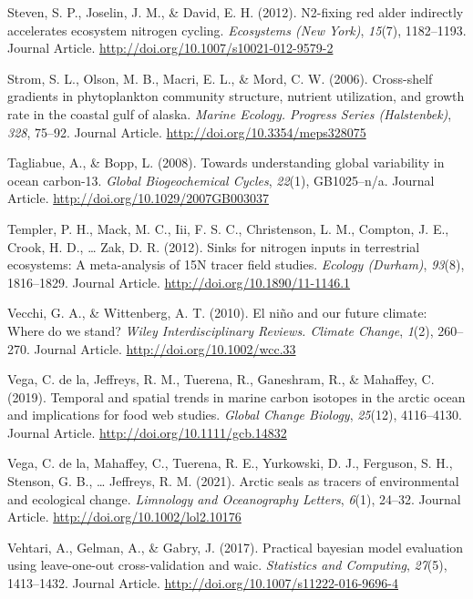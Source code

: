 \documentclass [11pt, proquest] {uwthesis}[2015/03/03]
\begin{document}
\hypertarget{ref-Perakis2012}{}
Steven, S. P., Joselin, J. M., \& David, E. H. (2012). N2-fixing red
alder indirectly accelerates ecosystem nitrogen cycling.
\emph{Ecosystems (New York)}, \emph{15}(7), 1182--1193. Journal Article.
\url{http://doi.org/10.1007/s10021-012-9579-2}

\hypertarget{ref-Strom2006}{}
Strom, S. L., Olson, M. B., Macri, E. L., \& Mord, C. W. (2006).
Cross-shelf gradients in phytoplankton community structure, nutrient
utilization, and growth rate in the coastal gulf of alaska. \emph{Marine
Ecology. Progress Series (Halstenbek)}, \emph{328}, 75--92. Journal
Article. \url{http://doi.org/10.3354/meps328075}

\hypertarget{ref-Tagliabue2008}{}
Tagliabue, A., \& Bopp, L. (2008). Towards understanding global
variability in ocean carbon-13. \emph{Global Biogeochemical Cycles},
\emph{22}(1), GB1025--n/a. Journal Article.
\url{http://doi.org/10.1029/2007GB003037}

\hypertarget{ref-Templer2012}{}
Templer, P. H., Mack, M. C., Iii, F. S. C., Christenson, L. M., Compton,
J. E., Crook, H. D., \ldots{} Zak, D. R. (2012). Sinks for nitrogen
inputs in terrestrial ecosystems: A meta-analysis of 15N tracer field
studies. \emph{Ecology (Durham)}, \emph{93}(8), 1816--1829. Journal
Article. \url{http://doi.org/10.1890/11-1146.1}

\hypertarget{ref-Vecchi2010}{}
Vecchi, G. A., \& Wittenberg, A. T. (2010). El niño and our future
climate: Where do we stand? \emph{Wiley Interdisciplinary Reviews.
Climate Change}, \emph{1}(2), 260--270. Journal Article.
\url{http://doi.org/10.1002/wcc.33}

\hypertarget{ref-delaVega2019}{}
Vega, C. de la, Jeffreys, R. M., Tuerena, R., Ganeshram, R., \&
Mahaffey, C. (2019). Temporal and spatial trends in marine carbon
isotopes in the arctic ocean and implications for food web studies.
\emph{Global Change Biology}, \emph{25}(12), 4116--4130. Journal
Article. \url{http://doi.org/10.1111/gcb.14832}

\hypertarget{ref-delaVega2021}{}
Vega, C. de la, Mahaffey, C., Tuerena, R. E., Yurkowski, D. J.,
Ferguson, S. H., Stenson, G. B., \ldots{} Jeffreys, R. M. (2021). Arctic
seals as tracers of environmental and ecological change. \emph{Limnology
and Oceanography Letters}, \emph{6}(1), 24--32. Journal Article.
\url{http://doi.org/10.1002/lol2.10176}

\hypertarget{ref-Vehtari2017}{}
Vehtari, A., Gelman, A., \& Gabry, J. (2017). Practical bayesian model
evaluation using leave-one-out cross-validation and waic.
\emph{Statistics and Computing}, \emph{27}(5), 1413--1432. Journal
Article. \url{http://doi.org/10.1007/s11222-016-9696-4}
\end{document}
